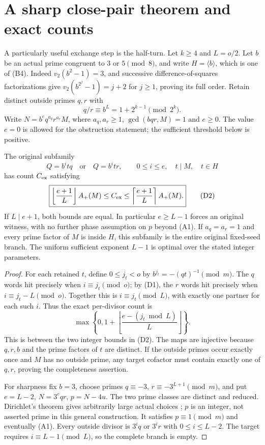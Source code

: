 \section{A sharp close-pair theorem and exact counts}
A particularly useful exchange step is the half-turn. Let $k\ge4$ and
$L=o/2$. Let $b$ be an actual prime congruent to $3$ or $5\pmod8$, and write
$H=\langle b\rangle$, which is one of (B4). Indeed $v_2(b^2-1)=3$,
and successive difference-of-squares factorizations give
$v_2(b^{2^j}-1)=j+2$ for $j\ge1$, proving its full order. Retain distinct outside primes
$q,r$ with
\[
 \boxed{q/r\equiv b^L=1+2^{k-1}\pmod{2^k}.}                \tag{D1}
\]
Write $N=b^e q^{a_q}r^{a_r}M$, where $a_q,a_r\ge1$,
$\gcd(bqr,M)=1$ and $e\ge0$. The value $e=0$ is allowed for the obstruction
statement; the sufficient threshold below is positive.

\begin{theorem}
The original subfamily
\[
 Q=b^i t q\quad\text{or}\quad Q=b^i t r,
 \qquad 0\le i\le e,\quad t\mid M,\quad t\in H
\]
has count $C_{\rm ex}$ satisfying
\[
 \boxed{\left\lfloor\frac{e+1}{L}\right\rfloor A_+(M)
 \le C_{\rm ex}\le
 \left\lceil\frac{e+1}{L}\right\rceil A_+(M).}              \tag{D2}
\]
If $L\mid e+1$, both bounds are equal. In particular $e\ge L-1$ forces an
original witness, with no further phase assumption on $p$ beyond (A1).
If $a_q=a_r=1$ and every prime factor of $M$ is inside $H$, this subfamily
is the entire original fixed-seed branch.
The uniform sufficient exponent $L-1$ is optimal over the stated integer
parameters.
\end{theorem}
\begin{proof}
For each retained $t$, define $0\le j_t<o$ by
$b^{j_t}=-(qt)^{-1}\pmod m$. The $q$ words hit precisely when
$i\equiv j_t\pmod o$; by (D1), the $r$ words hit precisely when
$i\equiv j_t-L\pmod o$. Together this is
$i\equiv j_t\pmod L$, with exactly one partner for each such $i$.
Thus the exact per-divisor count is
\[
 \max\left\{0,1+\left\lfloor\frac{e-(j_t\bmod L)}L\right\rfloor\right\}.
                                                               \tag{D3}
\]
This is between the two integer bounds in (D2). The maps are injective because
$q,r,b$ and the prime factors of $t$ are distinct. If the outside primes occur
exactly once and $M$ has no outside prime, any target cofactor must contain
exactly one of $q,r$, proving the completeness assertion.

For sharpness fix $b=3$, choose primes
$q\equiv-3$, $r\equiv-3^{L+1}\pmod m$, and put
$e=L-2$, $N=3^e qr$, $p=N-4u$.
The two prime classes are distinct and reduced. Dirichlet's theorem gives
arbitrarily large actual choices \cite[Theorem 18.1]{Sutherland}; $p$ is
an integer, not asserted prime in this general construction.
It satisfies $p\equiv1\pmod m$ and eventually (A1).
Every outside divisor is $3^iq$ or $3^ir$ with $0\le i\le L-2$.
The target requires $i\equiv L-1\pmod L$, so the complete branch is empty.
\end{proof}

